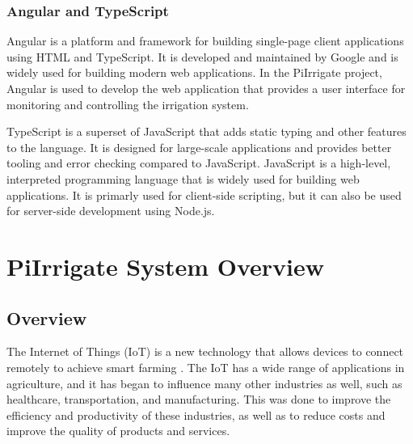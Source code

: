 \subsection{Angular and TypeScript}
Angular is a platform and framework for building single-page client applications using HTML and TypeScript.
It is developed and maintained by Google and is widely used for building modern web applications.
In the PiIrrigate project, Angular is used to develop the web application that provides a user interface for
monitoring and controlling the irrigation system.

TypeScript is a superset of JavaScript that adds static typing and other features to the language.
It is designed for large-scale applications and provides better tooling and error checking compared to JavaScript.
JavaScript is a high-level, interpreted programming language that is widely used for building web applications.
It is primarly used for client-side scripting, but it can also be used for
 server-side development using Node.js.

\chapter{PiIrrigate System Overview}\label{section:overview}

\section{Overview}
The Internet of Things (IoT) is a new technology that allows devices to connect remotely to achieve smart
farming \cite{agriculture12101745}. The IoT has a wide range of applications in agriculture, and it has 
began to influence many other industries as well, such as healthcare, transportation, and manufacturing. 
This was done to improve the efficiency and productivity of these industries, 
as well as to reduce costs and improve the quality of products and services\cite{s19081833}.

